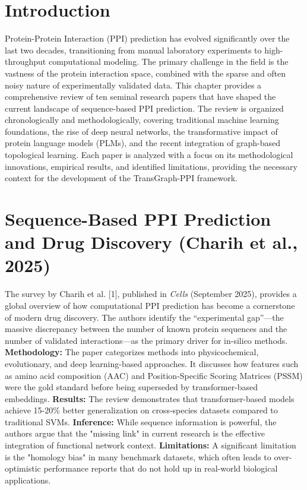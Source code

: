\documentclass[12pt,a4paper]{report}
\begin{document}
\section{Introduction}
Protein-Protein Interaction (PPI) prediction has evolved significantly over the last two decades, transitioning from manual laboratory experiments to high-throughput computational modeling. The primary challenge in the field is the vastness of the protein interaction space, combined with the sparse and often noisy nature of experimentally validated data. This chapter provides a comprehensive review of ten seminal research papers that have shaped the current landscape of sequence-based PPI prediction. The review is organized chronologically and methodologically, covering traditional machine learning foundations, the rise of deep neural networks, the transformative impact of protein language models (PLMs), and the recent integration of graph-based topological learning. Each paper is analyzed with a focus on its methodological innovations, empirical results, and identified limitations, providing the necessary context for the development of the TransGraph-PPI framework.

\section{Sequence-Based PPI Prediction and Drug Discovery (Charih et al., 2025)}
The survey by Charih et al. [1], published in \textit{Cells} (September 2025), provides a global overview of how computational PPI prediction has become a cornerstone of modern drug discovery. The authors identify the ``experimental gap''---the massive discrepancy between the number of known protein sequences and the number of validated interactions---as the primary driver for in-silico methods.
\textbf{Methodology:} The paper categorizes methods into physicochemical, evolutionary, and deep learning-based approaches. It discusses how features such as amino acid composition (AAC) and Position-Specific Scoring Matrices (PSSM) were the gold standard before being superseded by transformer-based embeddings.
\textbf{Results:} The review demonstrates that transformer-based models achieve 15-20\% better generalization on cross-species datasets compared to traditional SVMs.
\textbf{Inference:} While sequence information is powerful, the authors argue that the "missing link" in current research is the effective integration of functional network context.
\textbf{Limitations:} A significant limitation is the "homology bias" in many benchmark datasets, which often leads to over-optimistic performance reports that do not hold up in real-world biological applications.
\end{document}
